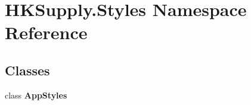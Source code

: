 \hypertarget{namespace_h_k_supply_1_1_styles}{}\section{H\+K\+Supply.\+Styles Namespace Reference}
\label{namespace_h_k_supply_1_1_styles}
\subsection*{Classes}
\begin{DoxyCompactItemize}
\item 
class {\bfseries App\+Styles}
\end{DoxyCompactItemize}
